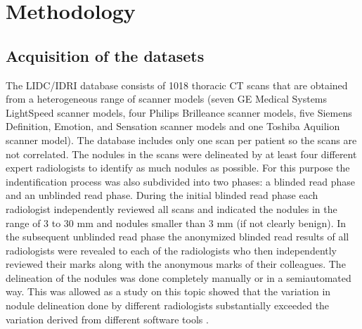 \section{Methodology}
\subsection{Acquisition of the datasets}
The LIDC/IDRI database consists of 1018 thoracic CT scans that are obtained from
a heterogeneous range of scanner models (seven GE Medical Systems LightSpeed
scanner models, four Philips Brilleance scanner models, five Siemens Definition,
Emotion, and Sensation scanner models and one Toshiba Aquilion scanner model).
The database includes only one scan per patient so the scans are not correlated.
The nodules in the scans were delineated by at least four different expert
radiologists to identify as much nodules as possible. For this purpose the
indentification process was also subdivided into two phases: a blinded read
phase and an unblinded read phase. During the initial blinded read phase each
radiologist independently reviewed all scans and indicated the nodules in the
range of 3 to 30 mm and nodules smaller than 3 mm (if not clearly benign).
In the subsequent unblinded read phase the anonymized blinded read results of
all radiologists were revealed to each of the radiologists who then
independently reviewed their marks along with the anonymous marks of their
colleagues. The delineation of the nodules was done completely manually or in a
semiautomated way. This was allowed as a study on this topic showed that the
variation in nodule delineation done by different radiologists substantially
exceeded the variation derived from different software tools \cite{lidcbase}.

